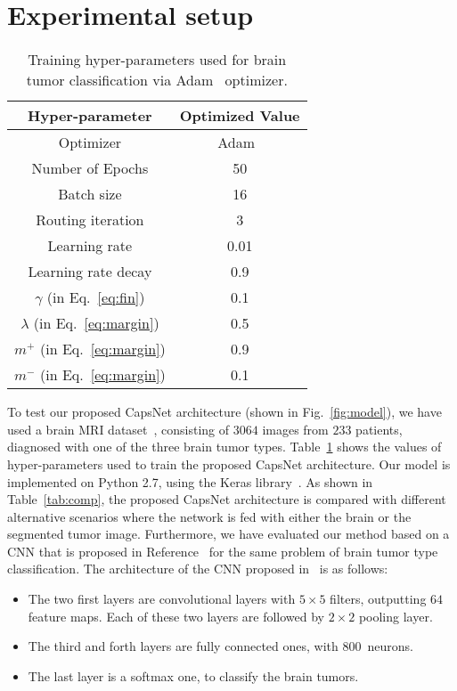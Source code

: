 \documentclass{article}
\begin{document}
\section{Experimental setup} \label{sec:EXP}
\begin{table}[t!]
\caption{\footnotesize Training hyper-parameters used for brain tumor classification via Adam~\cite{adam:2015} optimizer.}
\label{tab:hype}
\vspace{.05in}
\centering
\begin{tabular}{|c|c|}
\hline
\textbf{Hyper-parameter} & \textbf{Optimized Value} \\
\hline
Optimizer & Adam~\cite{adam:2015} \\
\hline\hline
Number of Epochs & 50 \\
Batch size & 16\\
Routing iteration & 3\\
Learning rate & 0.01\\
Learning rate decay & 0.9\\
$\gamma$ (in Eq.~\eqref{eq:fin}) & 0.1\\
$\lambda$ (in Eq.~\eqref{eq:margin}) & 0.5\\
$m^+$ (in Eq.~\eqref{eq:margin}) & 0.9\\
$m^-$ (in Eq.~\eqref{eq:margin}) & 0.1\\
\hline
\end{tabular}
\vspace{-.15in}
\end{table}
To test our proposed CapsNet architecture (shown in Fig.~\ref{fig:model}), we have used a brain MRI dataset~\cite{Cheng:2016}, consisting of $3064$ images from $233$ patients, diagnosed with one of the three brain tumor types. Table~\ref{tab:hype} shows the values of hyper-parameters used to train the proposed CapsNet architecture. Our model is implemented on Python 2.7, using the Keras library~\cite{keras:2016}. As shown in Table~\ref{tab:comp}, the proposed CapsNet architecture is compared with different alternative scenarios where the network is fed with either the brain or the segmented tumor image. Furthermore, we have evaluated our method based on a CNN that is proposed in Reference~\cite{Justin:2017} for the same problem of brain tumor type classification. The architecture of the CNN proposed in~\cite{Justin:2017} is as follows:
\begin{itemize}
\item The two first layers are  convolutional layers with $5 \times 5$ filters, outputting $64$ feature maps. Each of these two layers are followed by $2 \times 2$ pooling layer.
\vspace{-.0125in}
\item The third and forth layers are fully connected ones, with $800$~neurons.
\vspace{-.0125in}
\item The last layer is a softmax one, to classify the brain tumors.
\vspace{-.0125in}
\end{itemize}
\end{document}
